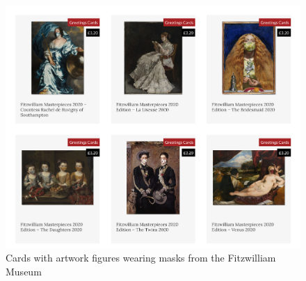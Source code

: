 \documentclass{egpubl}
\begin{document}
\begin{figure}[h]
  \centering
  \includegraphics[width=\linewidth]{images/fitz.png}
  \caption{\label{fig:fitz}
            Cards with artwork figures wearing masks from the Fitzwilliam Museum}
\end{figure}













\end{document}

